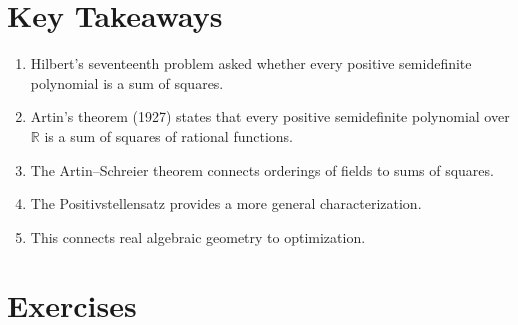 \section*{Key Takeaways}

\begin{enumerate}
    \item Hilbert's seventeenth problem asked whether every positive semidefinite polynomial is a sum of squares.
    \item Artin's theorem (1927) states that every positive semidefinite polynomial over $\mathbb{R}$ is a sum of squares of rational functions.
    \item The Artin--Schreier theorem connects orderings of fields to sums of squares.
    \item The Positivstellensatz provides a more general characterization.
    \item This connects real algebraic geometry to optimization.
\end{enumerate}

\section*{Exercises}

